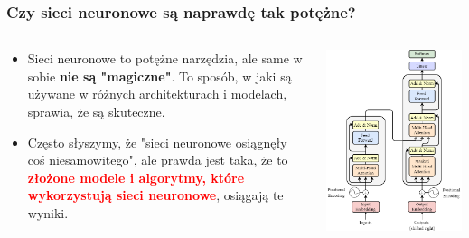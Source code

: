 \documentclass[smaller]{beamer}
\begin{document}
\begin{frame}
\frametitle{Czy sieci neuronowe są naprawdę tak potężne?}

\begin{columns}
    \begin{column}{0.6\textwidth}
        \begin{itemize}
            \item Sieci neuronowe to potężne narzędzia, ale same w sobie \textbf{nie są "magiczne"}. To sposób, w jaki są używane w różnych architekturach i modelach, sprawia, że są skuteczne.
            \item Często słyszymy, że "sieci neuronowe osiągnęły coś niesamowitego", ale prawda jest taka, że to \textbf{\textcolor{red}{złożone modele i algorytmy, które wykorzystują sieci neuronowe}}, osiągają te wyniki.
        \end{itemize}
    \end{column}

    \begin{column}{0.4\textwidth}
        \includegraphics[width=\textwidth]{../manifest/transformer.png} %
    \end{column}
\end{columns}
\end{frame}
\end{document}
